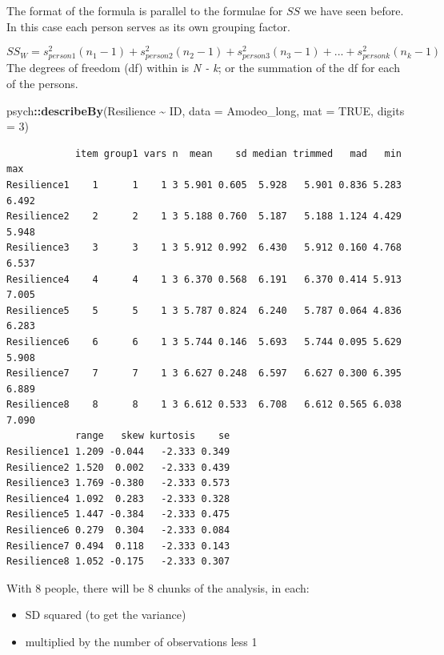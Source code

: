 \documentclass[
  11pt,
]{book}
\newenvironment{Shaded}{\begin{snugshade}}{\end{snugshade}}
\newcommand{\AttributeTok}[1]{\textcolor[rgb]{0.27,0.27,0.27}{#1}}
\newcommand{\ConstantTok}[1]{\textcolor[rgb]{0.37,0.37,0.37}{#1}}
\newcommand{\DecValTok}[1]{\textcolor[rgb]{0.06,0.06,0.06}{#1}}
\newcommand{\FunctionTok}[1]{\textcolor[rgb]{0.27,0.27,0.27}{\textbf{#1}}}
\newcommand{\NormalTok}[1]{#1}
\newcommand{\SpecialCharTok}[1]{\textcolor[rgb]{0.43,0.43,0.43}{\textbf{#1}}}
\providecommand{\tightlist}{%
  \setlength{\itemsep}{0pt}\setlength{\parskip}{0pt}}
\begin{document}
The format of the formula is parallel to the formulae for \(SS\) we have seen before. In this case each person serves as its own grouping factor.

\[SS_W = s_{person1}^{2}(n_{1}-1)+s_{person2}^{2}(n_{2}-1)+s_{person3}^{2}(n_{3}-1)+...+s_{personk}^{2}(n_{k}-1)\] The degrees of freedom (df) within is \emph{N - k}; or the summation of the df for each of the persons.

\begin{Shaded}
\begin{Highlighting}[]
\NormalTok{psych}\SpecialCharTok{::}\FunctionTok{describeBy}\NormalTok{(Resilience }\SpecialCharTok{\textasciitilde{}}\NormalTok{ ID, }\AttributeTok{data =}\NormalTok{ Amodeo\_long, }\AttributeTok{mat =} \ConstantTok{TRUE}\NormalTok{, }\AttributeTok{digits =} \DecValTok{3}\NormalTok{)}
\end{Highlighting}
\end{Shaded}

\begin{verbatim}
            item group1 vars n  mean    sd median trimmed   mad   min   max
Resilience1    1      1    1 3 5.901 0.605  5.928   5.901 0.836 5.283 6.492
Resilience2    2      2    1 3 5.188 0.760  5.187   5.188 1.124 4.429 5.948
Resilience3    3      3    1 3 5.912 0.992  6.430   5.912 0.160 4.768 6.537
Resilience4    4      4    1 3 6.370 0.568  6.191   6.370 0.414 5.913 7.005
Resilience5    5      5    1 3 5.787 0.824  6.240   5.787 0.064 4.836 6.283
Resilience6    6      6    1 3 5.744 0.146  5.693   5.744 0.095 5.629 5.908
Resilience7    7      7    1 3 6.627 0.248  6.597   6.627 0.300 6.395 6.889
Resilience8    8      8    1 3 6.612 0.533  6.708   6.612 0.565 6.038 7.090
            range   skew kurtosis    se
Resilience1 1.209 -0.044   -2.333 0.349
Resilience2 1.520  0.002   -2.333 0.439
Resilience3 1.769 -0.380   -2.333 0.573
Resilience4 1.092  0.283   -2.333 0.328
Resilience5 1.447 -0.384   -2.333 0.475
Resilience6 0.279  0.304   -2.333 0.084
Resilience7 0.494  0.118   -2.333 0.143
Resilience8 1.052 -0.175   -2.333 0.307
\end{verbatim}

With 8 people, there will be 8 chunks of the analysis, in each:

\begin{itemize}
\tightlist
\item
  SD squared (to get the variance)
\item
  multiplied by the number of observations less 1
\end{itemize}
\end{document}
